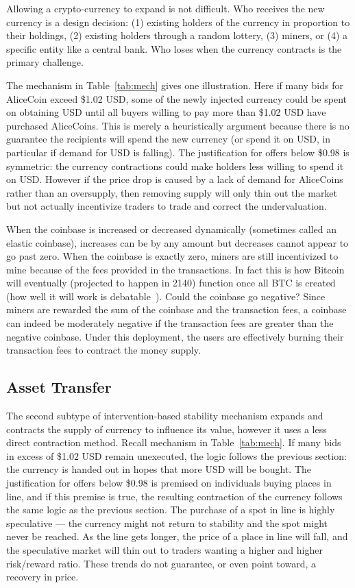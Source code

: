 Allowing a crypto-currency to expand is not difficult. Who receives the new currency is a design decision: (1) existing holders of the currency in proportion to their holdings, (2) existing holders through a random lottery, (3) miners, or (4) a specific entity like a central bank. Who loses when the currency contracts is the primary challenge.

The mechanism in Table~\ref{tab:mech} gives one illustration. Here if many bids for AliceCoin exceed \$1.02 USD, some of the newly injected currency could be spent on obtaining USD until all buyers willing to pay more than \$1.02 USD have purchased AliceCoins. This is merely a heuristically argument because there is no guarantee the recipients will spend the new currency (or spend it on USD, in particular if demand for USD is falling). The justification for offers below \$0.98 is symmetric: the currency contractions could make holders less willing to spend it on USD. However if the price drop is caused by a lack of demand for AliceCoins rather than an oversupply, then removing supply will only thin out the market but not actually incentivize traders to trade and correct the undervaluation.

When the coinbase is increased or decreased dynamically (sometimes called an elastic coinbase), increases can be by any amount but decreases cannot appear to go past zero. When the coinbase is exactly zero, miners are still incentivized to mine because of the fees provided in the transactions. In fact this is how Bitcoin will eventually (projected to happen in 2140) function once all BTC is created (how well it will work is debatable~\cite{carlsten2016instability}). Could the coinbase go negative? Since miners are rewarded the sum of the coinbase and the transaction fees, a coinbase can indeed be moderately negative if the transaction fees are greater than the negative coinbase. Under this deployment, the users are effectively burning their transaction fees to contract the money supply.


\subsection{Asset Transfer}
\label{sec:basecoin}

The second subtype of intervention-based stability mechanism expands and contracts the supply of currency to influence its value, however it uses a less direct contraction method. Recall mechanism in Table~\ref{tab:mech}. If many bids in excess of \$1.02 USD remain unexecuted, the logic follows the previous section: the currency is handed out in hopes that more USD will be bought. The justification for offers below \$0.98 is premised on individuals buying places in line, and if this premise is true, the resulting contraction of the currency follows the same logic as the previous section. The purchase of a spot in line is highly speculative --- the currency might not return to stability and the spot might never be reached. As the line gets longer, the price of a place in line will fall, and the speculative market will thin out to traders wanting a higher and higher risk/reward ratio. These trends do not guarantee, or even point toward, a recovery in price. 

